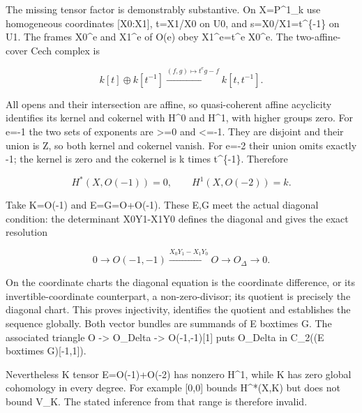 \documentclass[11pt]{article}
\begin{document}
The missing tensor factor is demonstrably substantive. On X\allowbreak{}=P\textasciicircum{}1\_\allowbreak{}k use homogeneous coordinates [X0:\allowbreak{}X1]\allowbreak{},\allowbreak{} t\allowbreak{}=X1/\allowbreak{}X0 on U0,\allowbreak{} and s\allowbreak{}=X0/\allowbreak{}X1\allowbreak{}=t\textasciicircum{}\{-1\} on U1. The frames X0\^{}e and X1\^{}e of O(e)\allowbreak{} obey X1\textasciicircum{}e\allowbreak{}=t\textasciicircum{}e X0\^{}e. The two-affine-cover Cech complex is

\[
 k[t]\oplus k[t^{-1}]
 \xrightarrow{(f,g)\mapsto t^e g-f}
 k[t,t^{-1}].
\]

All opens and their intersection are affine,\allowbreak{} so quasi-coherent affine acyclicity identifies its kernel and cokernel with H\^{}0 and H\textasciicircum{}1,\allowbreak{} with higher groups zero. For e\allowbreak{}=-1 the two sets of exponents are >\allowbreak{}=0 and <\allowbreak{}=-1. They are disjoint and their union is Z,\allowbreak{} so both kernel and cokernel vanish. For e\allowbreak{}=-2 their union omits exactly -1; the kernel is zero and the cokernel is k times t\^{}\{-1\}. Therefore

\[
 H^*(X,O(-1))=0,\qquad H^1(X,O(-2))=k.
\]

Take K\allowbreak{}=O(-1)\allowbreak{} and E\allowbreak{}=G\allowbreak{}=O\allowbreak{}+O(-1)\allowbreak{}. These E,\allowbreak{}G meet the actual diagonal condition:\allowbreak{} the determinant X0Y1-X1Y0 defines the diagonal and gives the exact resolution

\[
 0\to O(-1,-1)\xrightarrow{X_0Y_1-X_1Y_0}
 O\to O_\Delta\to0.
\]

On the coordinate charts the diagonal equation is the coordinate difference,\allowbreak{} or its invertible-coordinate counterpart,\allowbreak{} a non-zero-divisor; its quotient is precisely the diagonal chart. This proves injectivity,\allowbreak{} identifies the quotient and establishes the sequence globally. Both vector bundles are summands of E boxtimes G. The associated triangle O \allowbreak{}-> O\_\allowbreak{}Delta \allowbreak{}-> O(-1,\allowbreak{}-1)\allowbreak{}[1]\allowbreak{} puts O\_\allowbreak{}Delta in C\_\allowbreak{}2((E boxtimes G)\allowbreak{}[-1,\allowbreak{}1]\allowbreak{})\allowbreak{}.

Nevertheless K tensor E\allowbreak{}=O(-1)\allowbreak{}\allowbreak{}+O(-2)\allowbreak{} has nonzero H\textasciicircum{}1,\allowbreak{} while K has zero global cohomology in every degree. For example [0,\allowbreak{}0]\allowbreak{} bounds H\textasciicircum{}*(X,\allowbreak{}K)\allowbreak{} but does not bound V\_\allowbreak{}K. The stated inference from that range is therefore invalid.
\end{document}
